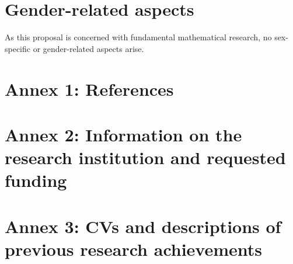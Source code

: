 \documentclass[a4paper,11pt]{scrartcl}
\begin{document}
\section{Gender-related aspects}\label{sec:gender}

As this proposal is concerned with fundamental mathematical research, no sex-specific or gender-related aspects arise.


\newpage
\section*{Annex 1: References}

\printbibliography[heading=none]

\newpage
\section*{Annex 2: Information on the research institution and requested funding}

\newpage
\section*{Annex 3: CVs and descriptions of previous research achievements}
\end{document}
